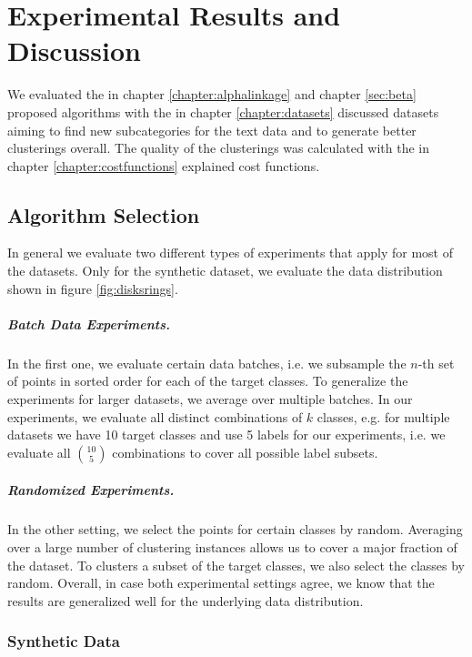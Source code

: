\chapter{Experimental Results and Discussion}
\label{sec:results}

We evaluated the in chapter \ref{chapter:alphalinkage} and chapter \ref{sec:beta} proposed algorithms with the in chapter \ref{chapter:datasets} discussed datasets aiming to find new subcategories for the text data and to generate better clusterings overall. The quality of the clusterings was calculated with the in chapter \ref{chapter:costfunctions} explained cost functions.

\section{Algorithm Selection}

In general we evaluate two different types of experiments that apply for most of the datasets. Only for the synthetic dataset, we evaluate the data distribution shown in figure \ref{fig:disksrings}.

\paragraph{Batch Data Experiments.} In the first one, we evaluate certain data batches, i.e. we subsample the $n$-th set of points in sorted order for each of the target classes. To generalize the experiments for larger datasets, we average over multiple batches. In our experiments, we evaluate all distinct combinations of $k$ classes, e.g. for multiple datasets we have 10 target classes and use 5 labels for our experiments, i.e. we evaluate all $10 \choose 5$ combinations to cover all possible label subsets.

\paragraph{Randomized Experiments.} In the other setting, we select the points for certain classes by random. Averaging over a large number of clustering instances allows us to cover a major fraction of the dataset. To clusters a subset of the target classes, we also select the classes by random. Overall, in case both experimental settings agree, we know that the results are generalized well for the underlying data distribution.

\subsection{Synthetic Data} 


